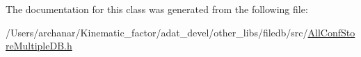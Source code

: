 The documentation for this class was generated from the following file\+:\begin{DoxyCompactItemize}
\item 
/\+Users/archanar/\+Kinematic\+\_\+factor/adat\+\_\+devel/other\+\_\+libs/filedb/src/\mbox{\hyperlink{other__libs_2filedb_2src_2AllConfStoreMultipleDB_8h}{All\+Conf\+Store\+Multiple\+D\+B.\+h}}\end{DoxyCompactItemize}
